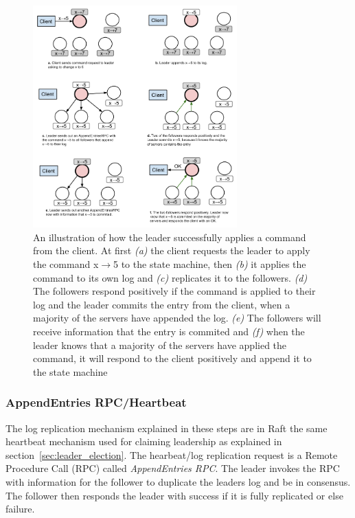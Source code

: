 \begin{figure}[ht!]
  \centering
  \includegraphics[width=0.7\textwidth]{figures/log-replication-example.png}
  \caption{An illustration of how the leader successfully applies a command from the client. At first \emph{(a)} the client requests the leader to apply the command x$\rightarrow$5 to the state machine, then \emph{(b)} it applies the command to its own log and \emph{(c)} replicates it to the followers. \emph{(d)} The followers respond positively if the command is applied to their log and the leader commits the entry from the client, when a majority of the servers have appended the log. \emph{(e)} The followers will receive information that the entry is commited and \emph{(f)} when the leader knows that a majority of the servers have applied the command, it will respond to the client positively and append it to the state machine}
  \label{fig:log_replication_example}
\end{figure}

\subsubsection{AppendEntries RPC/Heartbeat} %
\label{ssub:appendentries_rpc_heartbeat}

The log replication mechanism explained in these steps are in Raft the same heartbeat mechanism used for claiming leadership as explained in section~\ref{sec:leader_election}. The hearbeat/log replication request is a Remote Procedure Call (RPC) called \emph{AppendEntries RPC}. The leader invokes the RPC with information for the follower to duplicate the leaders log and be in consensus. The follower then responds the leader with success if it is fully replicated or else failure.

